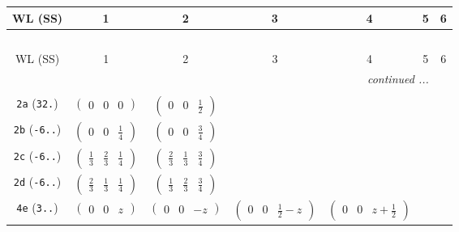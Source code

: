 \documentclass[fleqn,9pt,landscape]{jsarticle}
\begin{document}
\begin{center}
\renewcommand{\arraystretch}{1.2}
\begin{longtable}{ccccccc}
 \hline \hline
WL (SS) & 1 & 2 & 3 & 4 & 5 & 6 \\ \hline \endfirsthead

\multicolumn{6}{l}{\tablename\ \thetable{}} \\
 \hline \hline
WL (SS) & 1 & 2 & 3 & 4 & 5 & 6 \\ \hline \endhead

 \hline \hline
\multicolumn{6}{r}{\footnotesize\it continued ...} \\ \endfoot

 \hline \hline
\multicolumn{6}{r}{} \\ \endlastfoot

{\tt 2a} ({\tt 32.}) & $ \begin{pmatrix} 0 & 0 & 0 \end{pmatrix} $ & $ \begin{pmatrix} 0 & 0 & \frac{1}{2} \end{pmatrix} $ & $  $ & $  $ & $  $ & $  $ \\ \hline
{\tt 2b} ({\tt -6..}) & $ \begin{pmatrix} 0 & 0 & \frac{1}{4} \end{pmatrix} $ & $ \begin{pmatrix} 0 & 0 & \frac{3}{4} \end{pmatrix} $ & $  $ & $  $ & $  $ & $  $ \\ \hline
{\tt 2c} ({\tt -6..}) & $ \begin{pmatrix} \frac{1}{3} & \frac{2}{3} & \frac{1}{4} \end{pmatrix} $ & $ \begin{pmatrix} \frac{2}{3} & \frac{1}{3} & \frac{3}{4} \end{pmatrix} $ & $  $ & $  $ & $  $ & $  $ \\ \hline
{\tt 2d} ({\tt -6..}) & $ \begin{pmatrix} \frac{2}{3} & \frac{1}{3} & \frac{1}{4} \end{pmatrix} $ & $ \begin{pmatrix} \frac{1}{3} & \frac{2}{3} & \frac{3}{4} \end{pmatrix} $ & $  $ & $  $ & $  $ & $  $ \\ \hline
{\tt 4e} ({\tt 3..}) & $ \begin{pmatrix} 0 & 0 & z \end{pmatrix} $ & $ \begin{pmatrix} 0 & 0 & - z \end{pmatrix} $ & $ \begin{pmatrix} 0 & 0 & \frac{1}{2} - z \end{pmatrix} $ & $ \begin{pmatrix} 0 & 0 & z + \frac{1}{2} \end{pmatrix} $ & $  $ & $  $ \\ \hline

\end{longtable}
\end{center}
\end{document}
